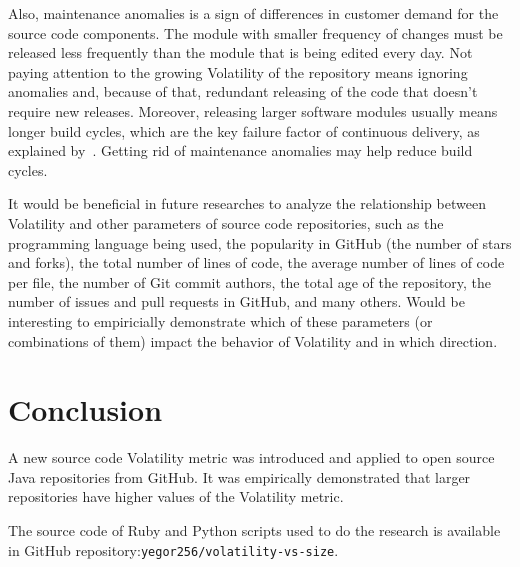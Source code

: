 \documentclass[sigplan,10pt,screen]{acmart}
\begin{document}
Also, maintenance anomalies is a sign of differences in customer demand
for the source code components. The module with smaller frequency of changes
must be released less frequently than the module that is being edited every day.
Not paying attention to the growing Volatility of the repository means
ignoring anomalies and, because of that, redundant releasing of the code
that doesn't require new releases. Moreover, releasing larger software modules
usually means longer build cycles, which are the key failure factor of
continuous delivery, as explained by~\cite{humble2010}. Getting rid of
maintenance anomalies may help reduce build cycles.

It would be beneficial in future researches to analyze the relationship between
Volatility and other parameters of source code repositories,
such as
the programming language being used,
the popularity in GitHub (the number of stars and forks),
the total number of lines of code,
the average number of lines of code per file,
the number of Git commit authors,
the total age of the repository,
the number of issues and pull requests in GitHub,
and many others.
Would be interesting to empiricially demonstrate which of these parameters
(or combinations of them)
impact the behavior of Volatility and in which direction.

\section{Conclusion}
\label{sec:conclusion}

A new source code Volatility metric was introduced and applied
to \thetotalrepos{} open source Java repositories from GitHub. It was
empirically demonstrated that larger repositories have higher values
of the Volatility metric.

The source code of Ruby and Python scripts used to do the research
is available in GitHub repository:\newline\texttt{yegor256/volatility-vs-size}.



\clearpage
\end{document}
